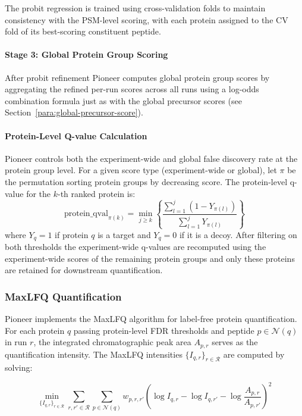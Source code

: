 \documentclass[pdflatex,sn-nature]{sn-jnl}
\begin{document}
The probit regression is trained using cross-validation folds to maintain consistency with the PSM-level scoring, with each protein assigned to the CV fold of its best-scoring constituent peptide.

\paragraph{Stage 3: Global Protein Group Scoring}\label{para:stage3-global-protein-group-scoring} After probit refinement Pioneer computes global protein group scores by aggregating the refined per-run scores across all runs using a log-odds combination formula just as with the global precursor scores (see Section~\ref{para:global-precursor-score}).


\paragraph{Protein-Level Q-value Calculation}\label{para:protein-level-qvalue-calculation} Pioneer controls both the experiment-wide and global false discovery rate at the protein group level. For a given score type (experiment-wide or global), let $\pi$ be the permutation sorting protein groups by decreasing score. The protein-level q-value for the $k$-th ranked protein is:
\begin{equation}
\text{protein\_qval}_{\pi(k)} = \min_{j \geq k} \left\{ \frac{\sum_{l=1}^{j} (1 - Y_{\pi(l)})}{\sum_{l=1}^{j} Y_{\pi(l)}} \right\}
\end{equation}
where $Y_q = 1$ if protein $q$ is a target and $Y_q = 0$ if it is a decoy. After filtering on both thresholds the experiment-wide q-values are recomputed using the experiment-wide scores of the remaining protein groups and only these proteins are retained for downstream quantification.


\subsubsection{MaxLFQ Quantification}\label{subsubsec:maxlfq-quantification}

Pioneer implements the MaxLFQ algorithm \cite{Cox2014-zm} for label-free protein quantification. For each protein $q$ passing protein-level FDR thresholds and peptide $p \in \mathcal{N}(q)$ in run $r$, the integrated chromatographic peak area $A_{p,r}$ serves as the quantification intensity. The MaxLFQ intensities $\{I_{q,r}\}_{r \in \mathcal{R}}$ are computed by solving:

\begin{equation}
\min_{\{I_{q,r}\}_{r \in \mathcal{R}}} \sum_{r,r' \in \mathcal{R}} \sum_{p \in \mathcal{N}(q)} w_{p,r,r'} \left( \log I_{q,r} - \log I_{q,r'} - \log \frac{A_{p,r}}{A_{p,r'}} \right)^2
\end{equation}
\end{document}
